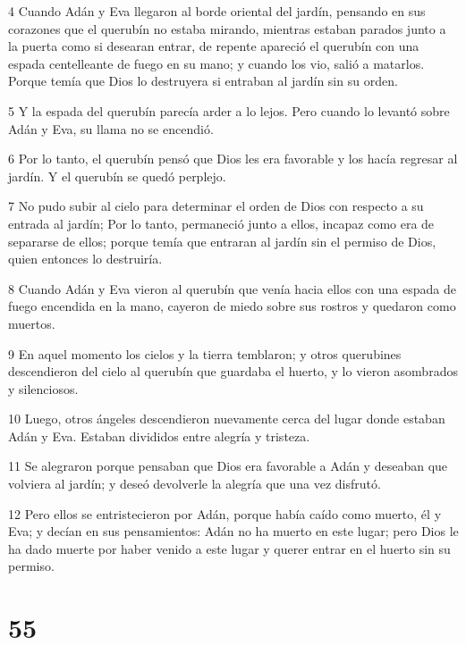 \par 4 Cuando Adán y Eva llegaron al borde oriental del jardín, pensando en sus corazones que el querubín no estaba mirando, mientras estaban parados junto a la puerta como si desearan entrar, de repente apareció el querubín con una espada centelleante de fuego en su mano; y cuando los vio, salió a matarlos. Porque temía que Dios lo destruyera si entraban al jardín sin su orden.

\par 5 Y la espada del querubín parecía arder a lo lejos. Pero cuando lo levantó sobre Adán y Eva, su llama no se encendió.

\par 6 Por lo tanto, el querubín pensó que Dios les era favorable y los hacía regresar al jardín. Y el querubín se quedó perplejo.

\par 7 No pudo subir al cielo para determinar el orden de Dios con respecto a su entrada al jardín; Por lo tanto, permaneció junto a ellos, incapaz como era de separarse de ellos; porque temía que entraran al jardín sin el permiso de Dios, quien entonces lo destruiría.

\par 8 Cuando Adán y Eva vieron al querubín que venía hacia ellos con una espada de fuego encendida en la mano, cayeron de miedo sobre sus rostros y quedaron como muertos.

\par 9 En aquel momento los cielos y la tierra temblaron; y otros querubines descendieron del cielo al querubín que guardaba el huerto, y lo vieron asombrados y silenciosos.

\par 10 Luego, otros ángeles descendieron nuevamente cerca del lugar donde estaban Adán y Eva. Estaban divididos entre alegría y tristeza.

\par 11 Se alegraron porque pensaban que Dios era favorable a Adán y deseaban que volviera al jardín; y deseó devolverle la alegría que una vez disfrutó.

\par 12 Pero ellos se entristecieron por Adán, porque había caído como muerto, él y Eva; y decían en sus pensamientos: Adán no ha muerto en este lugar; pero Dios le ha dado muerte por haber venido a este lugar y querer entrar en el huerto sin su permiso.



\chapter{55}

